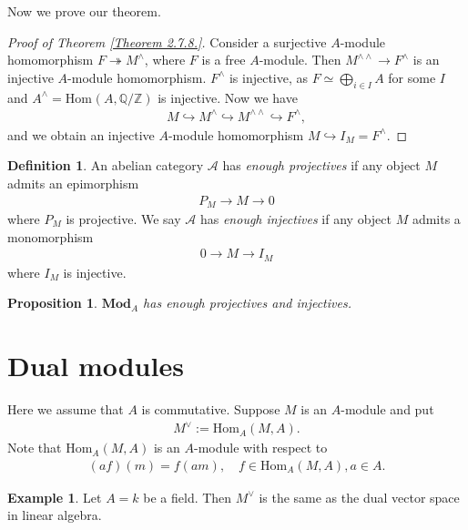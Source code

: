 \documentclass[12pt]{report}
\theoremstyle{plain}
\newtheorem{proposition}[theorem]{Proposition}
\theoremstyle{remark}
\theoremstyle{definition}
\newtheorem{definition}[theorem]{Definition}
\newtheorem{example}[theorem]{Example}
\newcommand{\Z}{\mathbb{Z}}
\newcommand{\Q}{\mathbb{Q}}
\newcommand{\Hom}[3]{\mathrm{Hom}_{#3}(#1,#2)}
\begin{document}
Now we prove our theorem.

\begin{proof}[Proof of Theorem \ref{Theorem 2.7.8.}]
    Consider a surjective $A$-module homomorphism $F\twoheadrightarrow M^\wedge$, where $F$ is a free $A$-module. Then $M^{\wedge\wedge}\rightarrow F^\wedge$ is an injective $A$-module homomorphism. $F^\wedge$ is injective, as $F\simeq \bigoplus_{i\in I} A$ for some $I$ and $A^\wedge=\Hom{A}{\Q/\Z}{}$ is injective. Now we have
    \begin{align*}
        M\hookrightarrow M^\wedge \hookrightarrow M^{\wedge\wedge} \hookrightarrow F^\wedge,
    \end{align*}
    and we obtain an injective $A$-module homomorphism $M\hookrightarrow I_M=F^\wedge$.
\end{proof}

\begin{definition}
    An abelian category $\mathcal{A}$ has \emph{enough projectives} if any object $M$ admits an epimorphism
    \begin{align*}
        P_M\rightarrow M\rightarrow 0
    \end{align*}
    where $P_M$ is projective. We say $\mathcal{A}$ has \emph{enough injectives} if any object $M$ admits a monomorphism
    \begin{align*}
        0\rightarrow M\rightarrow I_M
    \end{align*}
    where $I_M$ is injective.
\end{definition}

\begin{proposition}
    $\mathbf{Mod}_A$ has enough projectives and injectives.
\end{proposition}


\section{Dual modules}
Here we assume that $A$ is commutative. Suppose $M$ is an $A$-module and put
\begin{align*}
    M^\vee := \Hom{M}{A}{A}.
\end{align*}
Note that $\Hom{M}{A}{A}$ is an $A$-module with respect to
\begin{align*}
    (af)(m)=f(am),\quad f\in \Hom{M}{A}{A},a\in A.
\end{align*}

\begin{example}
    Let $A=k$ be a field. Then $M^\vee$ is the same as the dual vector space in linear algebra.
\end{example}
\end{document}
